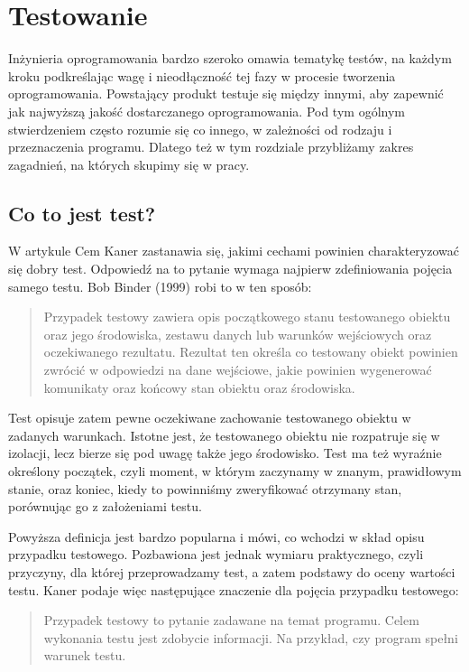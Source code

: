 \documentclass[00-praca-magisterska.tex]{subfiles}
\begin{document}
\chapter{Testowanie}
\label{testowanie}

Inżynieria oprogramowania bardzo szeroko omawia tematykę testów, na każdym
kroku podkreślając wagę i nieodłączność tej fazy w procesie tworzenia
oprogramowania.  Powstający produkt testuje się między innymi, aby zapewnić jak
najwyższą jakość dostarczanego oprogramowania. Pod tym ogólnym stwierdzeniem
często rozumie się co innego, w zależności od rodzaju i przeznaczenia programu.
Dlatego też w tym rozdziale przybliżamy zakres zagadnień, na których skupimy
się w pracy.

\section{Co to jest test?}
\label{test}

W artykule \cite{good-test} Cem Kaner zastanawia się, jakimi cechami powinien
charakteryzować się dobry test.  Odpowiedź na to pytanie wymaga najpierw
zdefiniowania pojęcia samego testu. Bob Binder (1999) robi to w ten sposób:

\begin{quote}
Przypadek testowy zawiera opis początkowego stanu testowanego obiektu oraz jego
środowiska, zestawu danych lub warunków wejściowych oraz oczekiwanego
rezultatu. Rezultat ten określa co testowany obiekt powinien zwrócić w
odpowiedzi na dane wejściowe, jakie powinien wygenerować komunikaty oraz
końcowy stan obiektu oraz środowiska.
\end{quote}

Test opisuje zatem pewne oczekiwane zachowanie testowanego obiektu w zadanych
warunkach. Istotne jest, że testowanego obiektu nie rozpatruje się w izolacji,
lecz bierze się pod uwagę także jego środowisko. Test ma też wyraźnie określony
początek, czyli moment, w którym zaczynamy w znanym, prawidłowym stanie, oraz
koniec, kiedy to powinniśmy zweryfikować otrzymany stan, porównując go z
założeniami testu.

Powyższa definicja jest bardzo popularna i mówi, co wchodzi w skład opisu
przypadku testowego. Pozbawiona jest jednak wymiaru praktycznego, czyli
przyczyny, dla której przeprowadzamy test, a zatem podstawy do oceny wartości
testu. Kaner \cite{good-test} podaje więc następujące znaczenie dla pojęcia
przypadku testowego:

\begin{quote}Przypadek testowy to pytanie zadawane na temat programu. Celem
wykonania testu jest zdobycie informacji. Na przykład, czy program spełni
warunek testu.
\end{quote}
\end{document}
